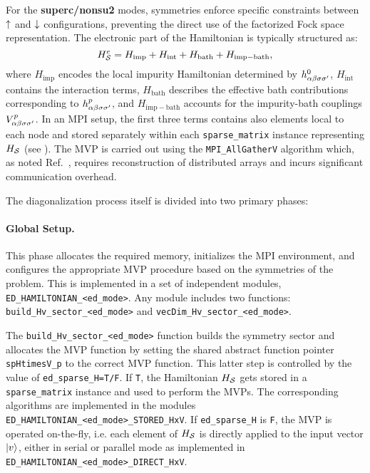 \documentclass[edipack_sp.tex]{subfiles}
\begin{document}
For the {\bf superc/nonsu2} modes, symmetries enforce specific constraints between
$\uparrow$ and $\downarrow$ configurations, preventing the direct use of the
factorized Fock space representation. The electronic
part of the Hamiltonian is typically structured as:
\begin{equation}
H^e_{\cal S} = H_\mathrm{imp} + H_\mathrm{int} + H_\mathrm{bath} + H_\mathrm{imp-bath},
\end{equation}
where $H_\mathrm{imp}$ encodes the local impurity Hamiltonian
determined by $h^0_{\alpha\beta\sigma\sigma'}$,
$H_\mathrm{int}$ contains the interaction terms, $H_\mathrm{bath}$
describes the effective bath contributions corresponding to
$h^p_{\alpha\beta\sigma\sigma'}$, and $H_\mathrm{imp-bath}$ accounts for the
impurity-bath couplings $V^p_{\alpha\beta\sigma\sigma'}$.
In an MPI setup, the first three terms contains also elements local to each node and
stored separately within each {\tt sparse\_matrix} instance representing $H_{\cal S}$ (see ).
The MVP is carried out using the {\tt MPI\_AllGatherV} algorithm which, as noted  
Ref.~, requires reconstruction of distributed
arrays and incurs significant communication overhead.
\vspace{2mm}


\noindent
The diagonalization process itself is divided into two primary phases:
\paragraph{\bf Global Setup.} This phase allocates the required memory, initializes
the MPI environment, and configures the appropriate MVP procedure
based on the symmetries of the problem. This is implemented in
a set of independent modules, {\tt ED\_HAMILTONIAN\_<ed\_mode>}. Any module includes two functions: {\tt build\_Hv\_sector\_<ed\_mode>} and  {\tt vecDim\-\_\-Hv\-\_\-sector\-\_\-<ed\_mode>}.

The {\tt build\_Hv\_sector\_<ed\_mode>} function builds the symmetry sector and
allocates the MVP function by setting the shared abstract function pointer {\tt
  spHtimesV\_p} to the correct MVP function. 
  This latter step is controlled by the value of
{\tt ed\_sparse\_H=T/F}. If {\tt T}, the Hamiltonian $H_{\cal S}$
gets stored in a {\tt sparse\_matrix} instance and used to perform
the MVPs. The corresponding algorithms are implemented in the modules {\tt
  ED\_HAMILTONIAN\-\_\-<ed\_mode>\-\_\-STORED\-\_HxV}.
If {\tt ed\_sparse\_H} is {\tt F}, the MVP is operated on-the-fly,
i.e. each element of $H_{\cal S}$ is directly applied to the input
vector $|v\rangle$, either in serial or parallel mode as implemented in {\tt
  ED\_HAMILTONIAN\_<ed\_mode>\_DIRECT\_HxV}.  
\end{document}
